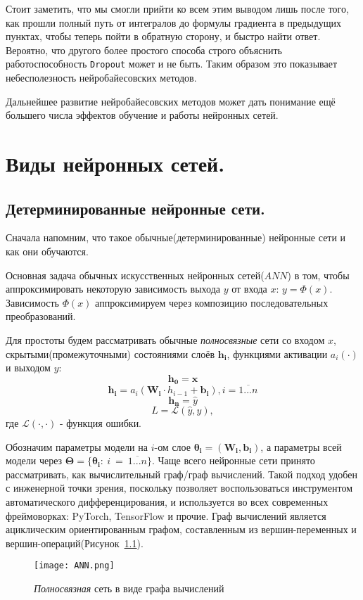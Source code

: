 Стоит заметить, что мы смогли прийти ко всем этим выводом лишь после того, как прошли полный путь от интегралов до формулы градиента в предыдущих пунктах, чтобы теперь пойти в обратную сторону, и быстро найти ответ. Вероятно, что другого более простого способа
 строго объяснить работоспособность \verb|Dropout| может и не быть. Таким образом это показывает небесполезность нейробайесовских методов.

Дальнейшее развитие нейробайесовских методов может дать понимание ещё большего числа эффектов обучение и работы нейронных сетей.

\chapter{Виды нейронных сетей.}

\section{Детерминированные нейронные сети.}

Сначала напомним, что такое обычные(детерминированные) нейронные сети и как они обучаются.

Основная задача обычных искусственных нейронных сетей($ANN$) в том, чтобы аппроксимировать некоторую зависимость выхода $y$ от
 входа $x$: $y = \Phi(x)$. Зависимость $\Phi(x)$ аппроксимируем через композицию последовательных преобразований.

Для простоты будем рассматривать обычные \textit{полносвязные} сети со входом $x$,
 скрытыми(промежуточными) состояниями слоёв $\bm{h_i}$, функциями активации $a_i(\cdot)$ и выходом $y$:
$$\bm{h_0} = \bm{x}$$
$$\bm{h_i} = a_i(\bm{W_i} \cdot h_{i-1} + \bm{b_i}), i = \overline{1...n}$$
$$\bm{h_n} = \widehat{y}$$
$$L = \mathcal{L}(\widehat{y}, y),$$ где $\mathcal{L}(\cdot, \cdot)$ - функция ошибки.

Обозначим параметры модели на $i$-ом слое $\bm{\theta_i} = (\bm{W_i}, \bm{b_i})$, а параметры всей модели через $\bm{\Theta} = \{\bm{\theta_i} :~i~=~\overline{1...n}\}$.
Чаще всего нейронные сети принято рассматривать, как вычислительный граф/граф вычислений.
 Такой подход удобен с инженерной точки зрения, поскольку позволяет воспользоваться инструментом автоматического
 дифференцирования, и используется во всех современных фреймоворках: PyTorch, TensorFlow и прочие.
 Граф вычислений является ациклическим ориентированным графом, составленным из вершин-переменных и вершин-операций(Рисунок~\ref{fig:ANN}).
\begin{figure}[H]
    \centering
    \texttt{[image: ANN.png]}
    \caption{\textit{Полносвязная} сеть в виде графа вычислений}
    \label{fig:ANN}
\end{figure}

